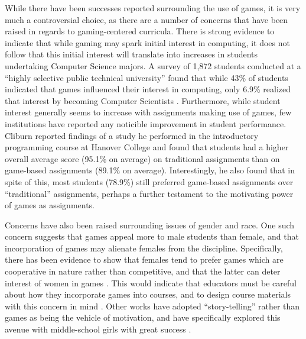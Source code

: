 
While there have been successes reported surrounding the use of games, it is very much a controversial choice, as there are a number of concerns that have been raised in regards to gaming-centered curricula.  There is strong evidence to indicate that while gaming may spark initial interest in computing, it does not follow that this initial interest will translate into increases in students undertaking Computer Science majors.  A survey of 1,872 students conducted at a ``highly selective public technical university'' found that while 43\% of students indicated that games influenced their interest in computing, only 6.9\% realized that interest by becoming Computer Scientists \cite{DiSalvo09}.  Furthermore, while student interest generally seems to increase with assignments making use of games, few institutions have reported any noticible improvement in student performance.  Cliburn reported findings of a study he performed in the introductory programming course at Hanover College and found that students had a higher overall average score (95.1\% on average) on traditional assignments than on game-based assignments (89.1\% on average)\cite{Cliburn06}.  Interestingly, he also found that in spite of this, most students (78.9\%) still preferred game-based assignments over ``traditional'' assignments, perhaps a further testament to the motivating power of games as assignments.

Concerns have also been raised surrounding issues of gender and race.  One such concern suggests that games appeal more to male students than female, and that incorporation of games may alienate females from the discipline.  Specifically, there has been evidence to show that females tend to prefer games which are cooperative in nature rather than competitive, and that the latter can deter interest of women in games \cite{Camp02}.  This would indicate that educators must be careful about how they incorporate games into courses, and to design course materials with this concern in mind \cite{Carmichael08}.  Other works have adopted ``story-telling'' rather than games as being the vehicle of motivation, and have specifically explored this avenue with middle-school girls with great success \cite{Kelleher06}.

